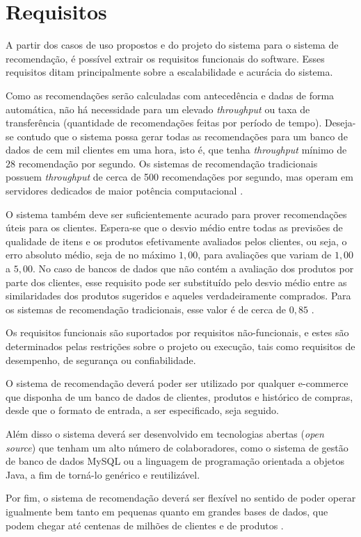\chapter[Requisitos]{Requisitos}
\label{chap:requisitos}

A partir dos casos de uso propostos e do projeto do sistema para o sistema de recomendação, é possível extrair os requisitos funcionais do software. Esses requisitos ditam principalmente sobre a escalabilidade e acurácia do sistema.

Como as recomendações serão calculadas com antecedência e dadas de forma automática, não há necessidade para um elevado \textit{throughput} ou taxa de transferência (quantidade de recomendações feitas por período de tempo). Deseja-se contudo que o sistema possa gerar todas as recomendações para um banco de dados de cem mil clientes em uma hora, isto é, que tenha \textit{throughput} mínimo de $28$ recomendação por segundo. Os sistemas de recomendação tradicionais possuem \textit{throughput} de cerca de 500 recomendações por segundo, mas operam em servidores dedicados de maior potência computacional \cite{sarwar2001item}.  

O sistema também deve ser suficientemente acurado para prover recomendações úteis para os clientes. Espera-se que o desvio médio entre todas as previsões de qualidade de itens e os produtos efetivamente avaliados pelos clientes, ou seja, o erro absoluto médio, seja de no máximo $1,00$, para avaliações que variam de $1,00$ a $5,00$. No caso de bancos de dados que não contém a avaliação dos produtos por parte dos clientes, esse requisito pode ser substituído pelo desvio médio entre as similaridades dos produtos sugeridos e aqueles verdadeiramente comprados. Para os sistemas de recomendação tradicionais, esse valor é de cerca de $0,85$ \cite{sarwar2002recommender}.

Os requisitos funcionais são suportados por requisitos não-funcionais, e estes são determinados pelas restrições sobre o projeto ou execução, tais como requisitos de desempenho, de segurança ou confiabilidade. 

O sistema de recomendação deverá poder ser utilizado por qualquer e-commerce que disponha de um banco de dados de clientes, produtos e histórico de compras, desde que o formato de entrada, a ser especificado, seja seguido.

Além disso o sistema deverá ser desenvolvido em tecnologias abertas (\textit{open source}) que tenham um alto número de colaboradores, como o sistema de gestão de banco de dados MySQL ou a linguagem de programação orientada a objetos Java, a fim de torná-lo genérico e reutilizável.

Por fim, o sistema de recomendação deverá ser flexível no sentido de poder operar igualmente bem tanto em pequenas quanto em grandes bases de dados, que podem chegar até centenas de milhões de clientes \cite{amazoncustomers} e de produtos \cite{amazonproducts}.